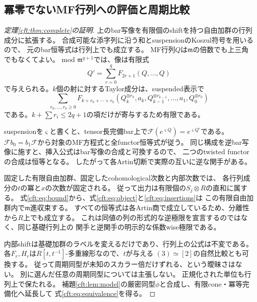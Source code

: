 \subsection{冪零でないMF行列への評価と周期比較}
\begin{proof}[定理\ref{cft:thm:complete}の証明]
上のbar写像を有限個のshiftを持つ自由加群の行列成分に拡張する。
合成可能な添字列に沿う和とsuspensionのKoszul符号を用いるので、
元のbar恒等式は行列上でも成立する。
MF行列$Q$は$\mathfrak m$の倍数でも上三角でもなくてよい。
mod $\mathfrak m^{q+1}$では、像は有限式
\begin{equation}\label{cft:eq:object}
 Q'=\sum_{r=0}^{q}F_{2r+1}(Q,\ldots,Q)
\end{equation}
で与えられる。$k$個の射に対するTaylor成分は、suspended表示で
\begin{equation}\label{cft:eq:insertions}
 \sum_{r_0,\ldots,r_k\ge0}
 F_{k+r_0+\cdots+r_k}
 (Q_k^{\otimes r_k},a_k,Q_{k-1}^{\otimes r_{k-1}},\ldots,a_1,Q_0^{\otimes r_0})
\end{equation}
である。$k+\sum r_i\le2q+1$の項だけが寄与するため有限である。

suspensionを$\varsigma$と書くと、tensor長完備bar上で$\mathcal F(e^{\varsigma Q})=e^{\varsigma Q'}$である。
$\mathcal F b_0=b_1\mathcal F$から対象のMF方程式と全functor恒等式が従う。
同じ構成を逆bar写像に施すと、挿入公式はbar写像の合成と可換するので、
二つのtwisted functorの合成は恒等となる。
したがって各Artin切断で実際の互いに逆な関手がある。

固定した有限自由加群、固定したcohomological次数と内部次数では、
各行列成分の$t$の冪と$x$の次数が固定される。
従って出力は有限個の$S_j\otimes R$の直和に属する。
式\eqref{cft:eq:bound}から、式\eqref{cft:eq:object}と\eqref{cft:eq:insertions}は
この有限自由加群内で$\mathfrak m$進収束する。
すべての恒等式は各Artin商で成立しているため、分離性から$R$上でも成立する。
これは同値の列の形式的な逆極限を宣言するのではなく、同じ基礎行列上の
関手と逆関手の明示的な係数wise極限である。

内部shiftは基礎加群のラベルを変えるだけであり、行列上の公式は不変である。
各$F_r,H_r$は$R[t,t^{-1}]$-多重線形なので、$t$が与える
$(3)\simeq[2]$の自然比較とも可換する。
従って周期同型が未知のスカラー倍だけずれる、という曖昧さはない。
別に選んだ任意の周期同型については主張しない。
正規化された単位も行列上で保たれる。
補題\ref{cft:lem:model}の厳密同型$\phi$と合成し、有限cone・冪等完備化へ延長して
式\eqref{cft:eq:equivalence}を得る。
\end{proof}

